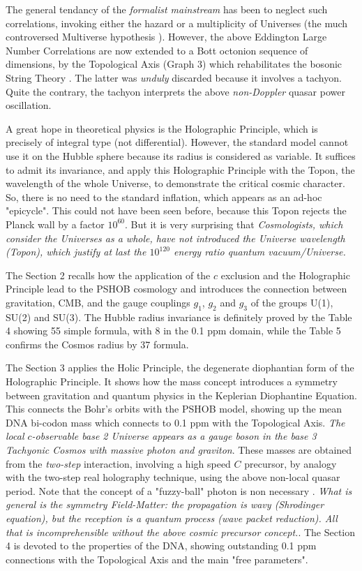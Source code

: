 \documentclass[a4paper,9pt]{article}
\begin{document}
The general tendancy of the \textit {formalist mainstream} has been to neglect such correlations, invoking either the hazard or a multiplicity of Universes (the much controversed Multiverse hypothesis \cite{Rees}). However, the above Eddington Large Number Correlations are now extended to a Bott octonion sequence of dimensions, by the Topological Axis (Graph 3) which rehabilitates the bosonic String Theory \cite{Sanchez2}. The latter was \textit {unduly} discarded because it involves a tachyon. Quite the contrary, the tachyon interprets the above \textit{non-Doppler} quasar power oscillation.

A great hope in theoretical physics is the Holographic Principle, which is precisely of integral type (not differential). However, the standard model cannot use it on the Hubble sphere because its radius is considered as variable. It suffices to admit its invariance, and apply this Holographic Principle with the Topon, the wavelength of the whole Universe, to demonstrate the critical cosmic character. So, there is no need to the standard inflation, which appears as an ad-hoc "epicycle". This could not have been seen before, because this Topon rejects the Planck wall by a factor $10^{60}$. But it is very surprising that \textit {Cosmologists, which consider the Universes as a whole, have not introduced the Universe wavelength (Topon), which justify at last the $10^{120}$ energy ratio quantum vacuum/Universe. \cite{Sanchez2} }

The Section 2 recalls how the application of the $c$ exclusion and the Holographic Principle lead to the PSHOB cosmology and introduces the connection between gravitation, CMB, and the gauge couplings $g_1$, $g_2$ and $g_3$ of the groups U(1), SU(2) and SU(3). The Hubble radius invariance is definitely proved by the Table 4 showing 55 simple formula, with 8 in the 0.1 ppm domain, while the Table 5 confirms the Cosmos radius by 37 formula.

The Section 3 applies the Holic Principle, the degenerate diophantian form of the Holographic Principle. It shows how the mass concept introduces a symmetry between gravitation and quantum physics in the Keplerian Diophantine Equation. This connects the Bohr’s orbits with the PSHOB model, showing up the mean DNA bi-codon mass which connects to 0.1 ppm with the Topological Axis. \textit{The local $c$-observable base 2 Universe appears as a gauge boson in the base 3 Tachyonic Cosmos with massive photon and graviton}. These masses are obtained from the \textit{two-step} interaction, involving a high speed $C$ precursor, by analogy with the two-step real holography technique, using the above non-local quasar period. Note that the concept of a "fuzzy-ball" photon is non necessary \cite{Scully}. \textit {What is general is the symmetry Field-Matter: the propagation is wavy (Shrodinger equation), but the reception is a quantum process (wave packet reduction). All that is incomprehensible without the above cosmic precursor concept.}. The Section 4 is devoted to the properties of the DNA, showing outstanding 0.1 ppm connections with the Topological Axis and the main "free parameters". 
\end{document}
